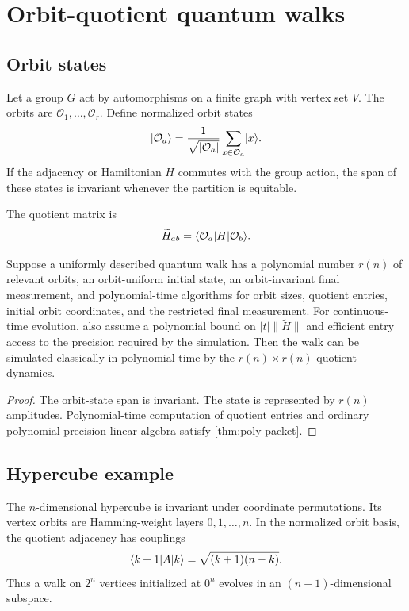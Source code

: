 \chapter{Orbit-quotient quantum walks}
\label{ch:orbit-quotients}

\section{Orbit states}
Let a group $G$ act by automorphisms on a finite graph with vertex set $V$. The orbits are $\mathcal O_1,\ldots,\mathcal O_r$. Define normalized orbit states
\[
\lvert \mathcal O_a\rangle
=
\frac1{\sqrt{|\mathcal O_a|}}
\sum_{x\in\mathcal O_a}\lvert x\rangle.
\]
If the adjacency or Hamiltonian $H$ commutes with the group action, the span of these states is invariant whenever the partition is equitable.

The quotient matrix is
\[
\widetilde H_{ab}
=
\langle \mathcal O_a\rvert H\lvert \mathcal O_b\rangle.
\]

\begin{theorem}
\label{thm:orbit-collapse}
Suppose a uniformly described quantum walk has a polynomial number $r(n)$ of relevant orbits, an orbit-uniform initial state, an orbit-invariant final measurement, and polynomial-time algorithms for orbit sizes, quotient entries, initial orbit coordinates, and the restricted final measurement. For continuous-time evolution, also assume a polynomial bound on $|t|\|\widetilde H\|$ and efficient entry access to the precision required by the simulation. Then the walk can be simulated classically in polynomial time by the $r(n)\times r(n)$ quotient dynamics.
\end{theorem}

\begin{proof}
The orbit-state span is invariant. The state is represented by $r(n)$ amplitudes. Polynomial-time computation of quotient entries and ordinary polynomial-precision linear algebra satisfy \cref{thm:poly-packet}.
\end{proof}

\section{Hypercube example}
The $n$-dimensional hypercube is invariant under coordinate permutations. Its vertex orbits are Hamming-weight layers $0,1,\ldots,n$. In the normalized orbit basis, the quotient adjacency has couplings
\begin{equation}
\langle k+1\rvert A\lvert k\rangle
=
\sqrt{(k+1)(n-k)}.
\label{eq:hypercube-coupling}
\end{equation}
Thus a walk on $2^n$ vertices initialized at $0^n$ evolves in an $(n+1)$-dimensional subspace.

